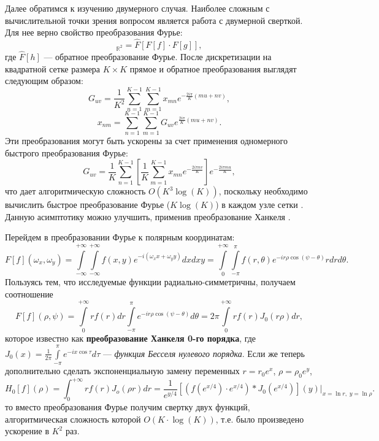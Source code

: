 Далее обратимся к изучению двумерного случая. Наиболее сложным с вычислительной точки зрения вопросом является работа с двумерной сверткой. Для нее верно свойство преобразования Фурье: 
 \begin{equation*}
[f*g]_{\mathbb{R}^{2}}=\hat{F}[F[f]\cdot F[g]],
\end{equation*}
где $\hat{F}[h]$ --- обратное преобразование Фурье. После дискретизации на квадратной сетке размера $ K\times K $ прямое и обратное преобразования выглядят следующим образом:
\begin{equation*}
 G_{uv}=\frac{1}{K^{2}}\sum\limits _{n=1}^{K-1}\sum\limits _{m=1}^{K-1}x_{mn}e^{-\frac{2i\pi}{K}(mu+nv)},
\end{equation*}
\begin{equation*}
 x_{nm}=\sum\limits _{n=1}^{K-1}\sum\limits _{m=1}^{K-1}G_{uv}e^{\frac{2i\pi}{K}(mu+nv)}.
\end{equation*}
 Эти преобразования могут быть ускорены за счет применения одномерного быстрого преобразования Фурье: 
\begin{equation*}
G_{uv}=\frac{1}{K}\sum\limits _{n=1}^{K-1}\left[\frac{1}{K}\sum\limits _{m=1}^{K-1}x_{mn}e^{-\frac{2i\pi nv}{K}}\right]e^{-\frac{2i\pi mu}{K}}, 
\end{equation*}
что дает алгоритмическую сложность $ O(K^{3}\log(K)) $, поскольку необходимо вычислить быстрое преобразование Фурье ($ K\log(K) $) в каждом узле сетки \cite{Press1996}. Данную асимптотику можно улучшить, применив преобразование Ханкеля \cite{Baddour:09}. 

Перейдем в преобразовании Фурье к полярным координатам: 
\begin{equation*}
 F[f](\omega_{x},\omega_{y})=\int\limits _{-\infty}^{+\infty}\int\limits _{-\infty}^{+\infty}f(x,y)e^{-i(\omega_{x}x+\omega_{y}y)}dxdxy=\int\limits _{0}^{+\infty}\int\limits _{-\pi}^{\pi}f(r,\theta)e^{-ir\rho\cos(\psi-\theta)}rdrd\theta.
\end{equation*}
Пользуясь тем, что исследуемые функции радиально-симметричны, получаем соотношение 
\begin{equation*}
F[f](\rho,\psi)=\int\limits _{0}^{+\infty}rf(r)dr\int\limits _{-\pi}^{\pi}e^{-ir\rho\cos(\psi-\theta)}d\theta=2\pi\int\limits _{0}^{+\infty}rf(r)J_{0}(r\rho)dr, 
\end{equation*}
которое известно как \textbf{{преобразование Ханкеля 0-го порядка}}, где $ J_{0}(x)=\frac{1}{2\pi}\int\limits _{-\pi}^{\pi}e^{-ix\cos\tau}d\tau $ --- \textit{функция Бесселя нулевого порядка}. Если же теперь дополнительно сделать экспоненциальную замену переменных $ r=r_{0}e^{x} $, $ \rho=\rho_{0}e^{y} $, 
\begin{equation*}
H_{0}[f](\rho)=\int_{0}^{+\infty}rf(r)J_{o}(\rho r)dr=\frac{1}{e^{y/4}}[(f(e^{x/4})\cdot e^{x/4})*J_{0}(e^{x/4})](y)|_{x=\ln r,\;y=\ln\rho}.
\end{equation*}
то вместо преобразования Фурье получим свертку двух функций, алгоритмическая сложность которой $ O(K\cdot\log(K)) $, т.е. было произведено ускорение в $ K^{2} $ раз.

